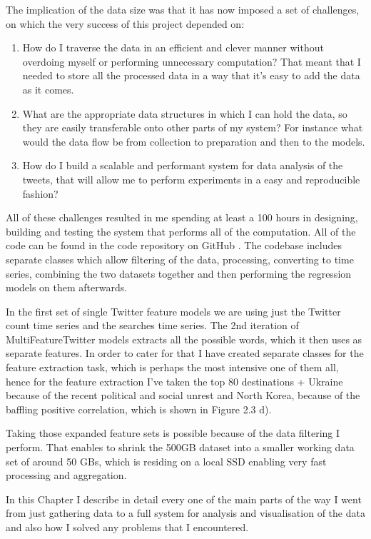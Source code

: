 \documentclass[minf,twoside,singlespacing,parskip,frontabs]{infthesis}
\begin{document}
The implication of the data size was that it has now imposed a set of challenges, on which the very success of this project depended on:
\begin{enumerate}
\item How do I traverse the data in an efficient and clever manner without overdoing myself or performing unnecessary computation? That meant that I needed to store all the processed data in a way that it's easy to add the data as it comes.
\item What are the appropriate data structures in which I can hold the data, so they are easily transferable onto other parts of my system? For instance what would the data flow be from collection to preparation and then to the models.
\item How do I build a scalable and performant system for data analysis of the tweets, that will allow me to perform experiments in a easy and reproducible fashion?
\end{enumerate}


All of these challenges resulted in me spending at least a 100 hours in designing, building and testing the system that performs all of the computation. All of the code can be found in the code repository on GitHub \cite{code}. The codebase includes separate classes which allow filtering of the data, processing, converting to time series, combining the two datasets together and then performing the regression models on them afterwards. 


In the first set of single Twitter feature models we are using just the Twitter count time series and the searches time series. The 2nd iteration of MultiFeatureTwitter models extracts all the possible words, which it then uses as separate features. In order to cater for that I have created separate classes for the feature extraction task, which is perhaps the most intensive one of them all, hence for the feature extraction I've taken the top 80 destinations + Ukraine because of the recent political and social unrest and North Korea, because of the baffling positive correlation, which is shown in Figure 2.3 d).

Taking those expanded feature sets is possible because of the data filtering I perform. That enables to shrink the 500GB dataset into a smaller working data set of around 50 GBs, which is residing on a local SSD enabling very fast processing and aggregation. 


In this Chapter I describe in detail every one of the main parts of the way I went from just gathering data to a full system for analysis and visualisation of the data and also how I solved any problems that I encountered.
\end{document}

